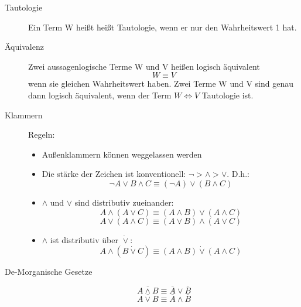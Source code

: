 \begin{description}
    \item[Tautologie] Ein Term W heißt heißt Tautologie, wenn er nur den Wahrheitswert 1 hat.
    \item[Äquivalenz] Zwei aussagenlogische Terme W und V heißen logisch äquivalent \[W \equiv V\] wenn sie gleichen Wahrheitswert haben. Zwei Terme W und V sind genau dann logisch äquivalent, wenn der Term $W\Leftrightarrow V$ Tautologie ist.
    \item[Klammern] Regeln:
    \begin{itemize}
        \item Außenklammern können weggelassen werden
        \item Die stärke der Zeichen ist konventionell: $\neg > \wedge > \vee$. D.h.:
        \[\neg A \vee B \wedge C \equiv (\neg A) \vee (B \wedge C)\]
        \item $\wedge$ und $\vee$ sind distributiv zueinander:
        \[A \wedge (A \vee C) \equiv (A \wedge B) \vee (A \wedge C)\]
        \[A \vee (A \wedge C) \equiv (A \vee B) \wedge (A \vee C)\]
        \item $\wedge$ ist distributiv über $\dot{\vee}$:
        \[A \wedge (B \dot{\vee} C) \equiv (A \wedge B) \dot{\vee} (A \wedge C)\]
    \end{itemize}
    \item[De-Morganische Gesetze] \[\overline{A \wedge B} \equiv \overline{A} \vee \overline{B}\] \[\overline{A \vee B} \equiv \overline{A} \wedge \overline{B}\]
\end{description}
